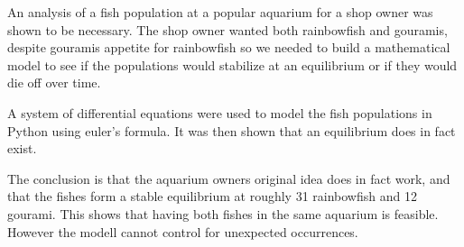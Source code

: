 \begin{flushleft}
    An analysis of a fish population at a popular aquarium for a shop owner was
    shown to be necessary. The shop owner wanted both rainbowfish and
    gouramis, despite gouramis appetite for rainbowfish so we
    needed to build a mathematical model to see if the populations
    would stabilize at an equilibrium or if they would die off over time.

\end{flushleft}

\begin{flushleft}
    A system of differential equations were used to model the fish populations
    in Python using euler's formula. It was then shown
    that an equilibrium does in fact exist.
\end{flushleft}

\begin{flushleft}
    The conclusion is that the aquarium owners original idea
    does in fact work, and that the fishes
    form a stable equilibrium at roughly 31 rainbowfish and 12 gourami. This shows
    that having both fishes in the same aquarium is feasible. However the modell
    cannot control for unexpected occurrences.
\end{flushleft}
